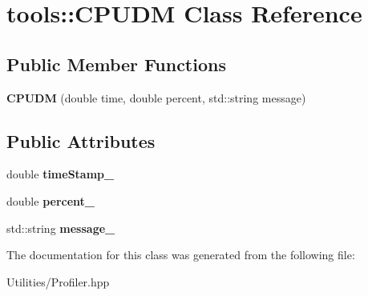 \hypertarget{classtools_1_1_c_p_u_d_m}{\section{tools\+:\+:C\+P\+U\+D\+M Class Reference}
\label{classtools_1_1_c_p_u_d_m}
}
\subsection*{Public Member Functions}
\begin{DoxyCompactItemize}
\item 
\hypertarget{classtools_1_1_c_p_u_d_m_abc3950c6a4ff8cbd0209e9642a1f8e78}{{\bfseries C\+P\+U\+D\+M} (double time, double percent, std\+::string message)}\label{classtools_1_1_c_p_u_d_m_abc3950c6a4ff8cbd0209e9642a1f8e78}

\end{DoxyCompactItemize}
\subsection*{Public Attributes}
\begin{DoxyCompactItemize}
\item 
\hypertarget{classtools_1_1_c_p_u_d_m_a68246d6addf043545d591db242982fb2}{double {\bfseries time\+Stamp\+\_\+}}\label{classtools_1_1_c_p_u_d_m_a68246d6addf043545d591db242982fb2}

\item 
\hypertarget{classtools_1_1_c_p_u_d_m_a365dadab245aef6b3bceb666289664ea}{double {\bfseries percent\+\_\+}}\label{classtools_1_1_c_p_u_d_m_a365dadab245aef6b3bceb666289664ea}

\item 
\hypertarget{classtools_1_1_c_p_u_d_m_a056aeef084b7c289a247139e68c75086}{std\+::string {\bfseries message\+\_\+}}\label{classtools_1_1_c_p_u_d_m_a056aeef084b7c289a247139e68c75086}

\end{DoxyCompactItemize}


The documentation for this class was generated from the following file\+:\begin{DoxyCompactItemize}
\item 
Utilities/Profiler.\+hpp\end{DoxyCompactItemize}
